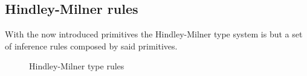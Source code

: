 \documentclass[11pt,oneside,a4paper]{report}
\begin{document}
\subsection{Hindley-Milner rules}
With the now introduced primitives the Hindley-Milner type system is but a set of inference rules composed by said primitives.
\begin{figure}
\begin{mdframed}
    \begin{prooftree}
    \end{prooftree}
    \endminipage
    \begin{prooftree}
    \end{prooftree}
    \endminipage\hfill\vspace{0.8cm}

    \begin{prooftree}
    \end{prooftree}
    \endminipage\hfill
    \begin{prooftree}
    \end{prooftree}
    \endminipage\hfill\vspace{0.8cm}

    \begin{prooftree}
    \end{prooftree}
    \endminipage\hfill
    \begin{prooftree}
    \end{prooftree}
    \endminipage
\end{mdframed}
\caption{Hindley-Milner type rules}
\label{fig:hmrules}
\end{figure}
\end{document}
